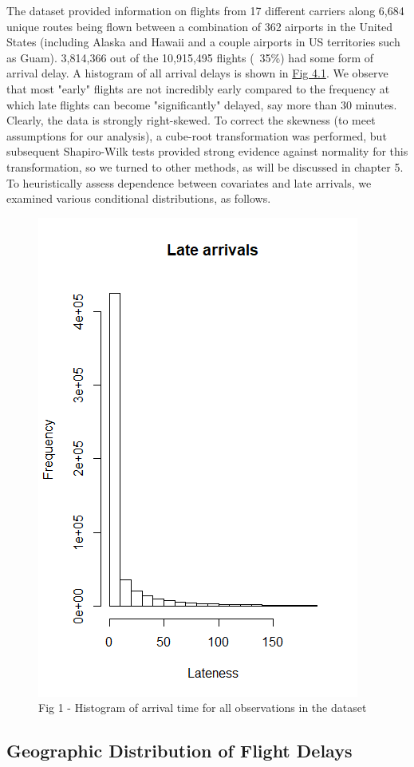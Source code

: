 \documentclass[12pt, a4paper]{book}
\newcommand\tab[1][1cm]{\hspace*{#1}}
\begin{document}
	\tab The dataset provided information on flights from 17 different carriers along 6,684 unique routes being flown between a combination of 362 airports in the United States (including Alaska and Hawaii and a couple airports in US territories such as Guam). 3,814,366 out of the 10,915,495 flights (~35\%) had some form of arrival delay. A histogram of all arrival delays is shown in \underline{Fig 4.1}. We observe that most "early" flights are not incredibly early compared to the frequency at which late flights can become "significantly" delayed, say more than 30 minutes. Clearly, the data is strongly right-skewed. To correct the skewness (to meet assumptions for our analysis), a cube-root transformation was performed, but subsequent Shapiro-Wilk tests provided strong evidence against normality for this transformation, so we turned to other methods, as will be discussed in chapter 5. To heuristically assess dependence between covariates and late arrivals, we examined various conditional distributions, as follows.\\
	\begin{figure}
	\centering
	 \includegraphics[width = .45 \textwidth]{../figures/LateArrivalsHistogram}
	 \caption{Fig 1 - Histogram of arrival time for all observations in the dataset}
	 \end{figure}
	 
		\subsection{Geographic Distribution of Flight Delays}
		
\end{document}
